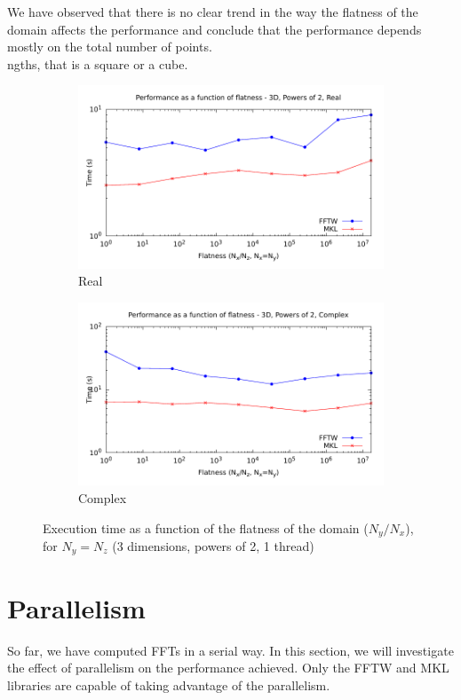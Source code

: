 \documentclass[12pt, a4paper]{article}
\begin{document}
We have observed that there is no clear trend in the way the flatness of the domain affects the performance and conclude that the performance depends mostly on the total number of points.\\
ngths, that is a square or a cube. 
\begin{figure}[H]
\captionsetup{width=0.8\linewidth}
\centering
\begin{subfigure}{.5\textwidth}
\centering
\includegraphics[width=.9\linewidth]{graphs/flatness-r.pdf}
\caption{Real}
\label{FLATNESSR}
\end{subfigure}%
\begin{subfigure}{.5\textwidth}
\centering
\includegraphics[width=.9\linewidth]{graphs/flatness-c.pdf}
\caption{Complex}
\label{FLATNESSC}
\end{subfigure}
\caption{Execution time as a function of the flatness of the domain ($N_y/N_x$), for $N_y=N_z$ (3 dimensions, powers of 2, 1 thread)}
\label{FLATNESS}
\end{figure}

\section{Parallelism}
So far, we have computed FFTs in a serial way. In this section, we will investigate the effect of parallelism on the performance achieved. Only the FFTW and MKL libraries are capable of taking advantage of the parallelism.  
\end{document}
